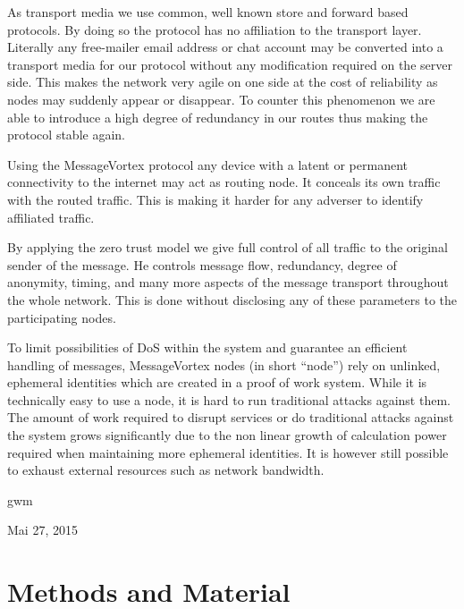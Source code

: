 \documentclass[9pt,journal,compsoc]{IEEEtran}
\begin{document}
As transport media we use common, well known store and forward based protocols. By doing so the protocol has no affiliation to the transport layer. Literally any free-mailer email address or chat account may be converted into a transport media for our protocol without any modification required on the server side. This makes the network very agile on one side at the cost of reliability as nodes may suddenly appear or disappear. To counter this phenomenon we are able to introduce a high degree of redundancy in our routes thus making the protocol stable again.

Using the MessageVortex protocol any device with a latent or permanent connectivity to the internet may act as routing node. It conceals its own traffic with the routed traffic. This is making it harder for any adverser to identify affiliated traffic. 

By applying the zero trust model we give full control of all traffic to the original sender of the message. He controls message flow, redundancy, degree of anonymity, timing, and many more aspects of the message transport throughout the whole network. This is done without disclosing any of these parameters to the participating nodes.

To limit possibilities of DoS within the system and guarantee an efficient handling of messages, MessageVortex nodes (in short ``node'') rely on unlinked, ephemeral identities which are created in a proof of work system. While it is technically easy to use a node, it is hard to run traditional attacks against them. The amount of work required to disrupt services or do traditional attacks against the system grows significantly due to the non linear growth of calculation power required when maintaining more ephemeral identities. It is however still possible to exhaust external resources such as network bandwidth.\par\nopagebreak
\ifCLASSOPTIONpeerreview
\else
\hfill gwm\par\nopagebreak
\hfill Mai 27, 2015
\fi

\section{Methods and Material}
\end{document}

